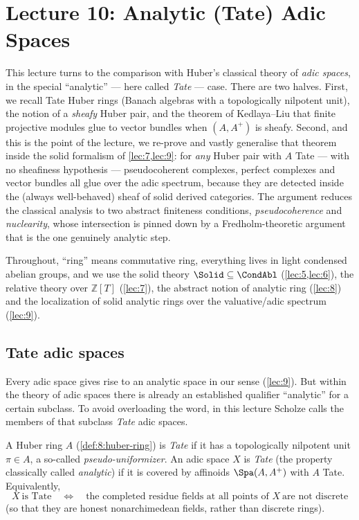 \section{Lecture 10: Analytic (Tate) Adic Spaces}
\label{lec:10}

This lecture turns to the comparison with Huber's
classical theory of \emph{adic spaces}, in the special ``analytic'' --- here
called \emph{Tate} --- case. There are two halves. First, we recall Tate Huber
rings (Banach algebras with a topologically nilpotent unit), the notion of a
\emph{sheafy} Huber pair, and the theorem of Kedlaya--Liu that finite projective
modules glue to vector bundles when $(A,A^{+})$ is sheafy. Second, and this is
the point of the lecture, we re-prove and vastly generalise that theorem inside
the solid formalism of \cref{lec:7,lec:9}: for \emph{any} Huber pair with $A$
Tate --- with no sheafiness hypothesis --- pseudocoherent complexes, perfect
complexes and vector bundles all glue over the adic spectrum, because they are
detected inside the (always well-behaved) sheaf of solid derived categories. The
argument reduces the classical analysis to two abstract finiteness conditions,
\emph{pseudocoherence} and \emph{nuclearity}, whose intersection is pinned down
by a Fredholm-theoretic argument that is the one genuinely analytic step.

Throughout, ``ring'' means commutative ring, everything lives in light condensed
abelian groups, and we use the solid theory $\Solid\subseteq\CondAbl$
(\cref{lec:5,lec:6}), the relative theory over $\mathbb{Z}[T]$ (\cref{lec:7}),
the abstract notion of analytic ring (\cref{lec:8}) and the localization of
solid analytic rings over the valuative/adic spectrum (\cref{lec:9}).

\subsection{Tate adic spaces}

\begin{remark}
\label{rmk:10:terminology}
Every adic space gives rise to an analytic space in our sense (\cref{lec:9}).
But within the theory of adic spaces there is already an established qualifier
``analytic'' for a certain subclass. To avoid overloading the word, in this
lecture Scholze calls the members of that subclass \emph{Tate} adic spaces.
\end{remark}

\begin{definition}
\label{def:10:tate}
A Huber ring $A$ (\cref{def:8:huber-ring}) is \emph{Tate} if it has a
topologically nilpotent unit $\pi\in A$, a so-called \emph{pseudo-uniformizer}.
An adic space $X$ is \emph{Tate} (the property classically called
\emph{analytic}) if it is covered by affinoids $\Spa(A,A^{+})$ with $A$ Tate.
Equivalently,
\begin{equation*}
X\ \text{is Tate}\quad\Longleftrightarrow\quad
\text{the completed residue fields at all points of }X\ \text{are not discrete}
\end{equation*}
(so that they are honest nonarchimedean fields, rather than discrete rings).
\end{definition}

